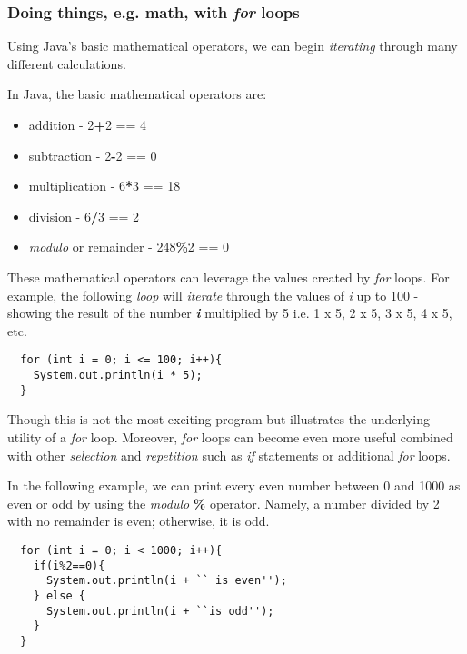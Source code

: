 \documentclass{article}
\begin{document}
\begin{flushleft}
\subsubsection{Doing things, e.g. math, with \emph{for} loops}
Using Java's basic mathematical operators, we can begin \emph{iterating} through many different calculations.
\begin{tcolorbox}[enhanced,width=5in,center upper,
    fontupper=\bfseries,drop fuzzy shadow southwest,
    boxrule=0.4pt,sharp corners,colframe=yellow!80!black,colback=yellow!10]
In Java, the basic mathematical operators are:  
\begin{itemize}
\item addition - 2\textbf{+}2 == 4
\item subtraction - 2\textbf{-}2 == 0
\item multiplication - 6\textbf{*}3 == 18
\item division - 6\textbf{/}3 == 2
\item \emph{modulo} or remainder - 248\textbf{\%}2 == 0
\end{itemize}
\end{tcolorbox}
\par

These mathematical operators can leverage the values created by \emph{for} loops.
For example, the following \emph{loop} will \emph{iterate} through the values of \emph{i} up to 100 - showing the result of the number \emph{\textbf{i}} multiplied by 5 i.e. 1 x 5, 2 x 5, 3 x 5, 4 x 5, etc.
\begin{verbatim}
  for (int i = 0; i <= 100; i++){
    System.out.println(i * 5);
  }
\end{verbatim}
\par
Though this is not the most exciting program but illustrates the underlying utility of a \emph{for} loop. Moreover, \emph{for} loops can become even more useful combined with other \emph{selection} and \emph{repetition} such as \emph{if} statements or additional \emph{for} loops. \par
In the following example, we can print every even number between 0 and 1000 as even or odd by using the \emph{modulo} \textbf{\%} operator. Namely, a number divided by 2 with no remainder is even; otherwise, it is odd.
\begin{verbatim}
  for (int i = 0; i < 1000; i++){
    if(i%2==0){
      System.out.println(i + `` is even'');
    } else {
      System.out.println(i + ``is odd'');
    }
  }
\end{verbatim}


\end{flushleft}
\end{document}
